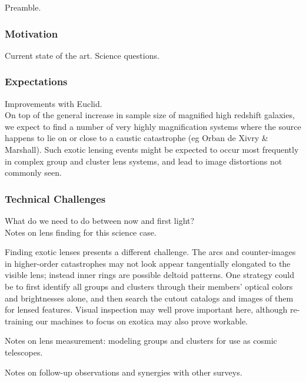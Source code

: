 \documentclass[twocolumn]{svjour3}
\begin{document}


Preamble.

\subsubsection{Motivation}
Current state of the art. Science questions.\\

\subsubsection{Expectations}

Improvements with Euclid.\\

On top of the general increase in sample size of magnified high redshift
galaxies, we expect to find a number of very highly magnification
systems where the source happens to lie on or close to a caustic
catastrophe (eg Orban de Xivry \& Marshall). Such exotic lensing events
might be expected to occur most frequently in complex group and cluster
lens systems, and lead to image distortions not commonly seen.

\subsubsection{Technical Challenges}

What do we need to do between now and first light?\\

Notes on lens finding for this science case.

Finding exotic lenses presents a different challenge. The arcs and
counter-images in higher-order catastrophes may not look appear
tangentially elongated to the visible lens; instead inner rings are
possible deltoid patterns. One strategy could be to first identify all
groups and clusters through their members' optical colors and
brightnesses alone, and then search the cutout catalogs and images of
them for lensed features. Visual inspection may well prove important
here, although re-training our machines to focus on exotica may also
prove workable.


Notes on lens measurement: modeling groups and clusters for use as
cosmic telescopes.

Notes on follow-up observations and synergies with other surveys.\\
\end{document}
